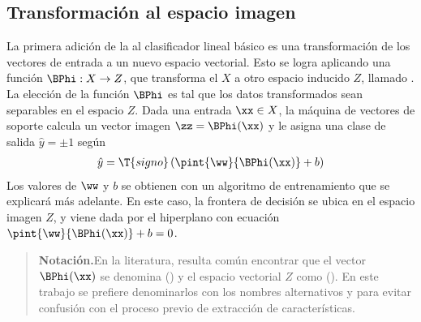 %
\subsection{Transformación al espacio imagen}
%
La primera adición de la \MVS{} al clasificador lineal básico es una
transformación de los vectores de entrada a un nuevo espacio vectorial.
Esto se logra aplicando una función $\BPhi:X\rightarrow{}Z$, que
transforma el  $X$ a otro espacio inducido $Z$,
llamado .
La elección de la función $\BPhi$ es tal que los datos transformados
sean separables en el espacio $Z$.
Dada una entrada $\xx\in{}X$, la máquina de vectores de soporte
calcula un vector imagen $\zz=\BPhi(\xx)$ y le asigna una clase de
salida $\hat{y}=\pm{}1$ según
%
\begin{align*}
  \hat{y} = \T{signo}\left(\pint{\ww}{\BPhi(\xx)}+b\right)
\end{align*}
%
Los valores de $\ww$ y $b$ se obtienen con un algoritmo de
entrenamiento que se explicará más adelante.
En este caso, la frontera de decisión se ubica en el espacio imagen
$Z$, y viene dada por el hiperplano con ecuación
$\pint{\ww}{\BPhi(\xx)}+b=0$.
%
\begin{quote}
  {\bfseries Notación.}\quad{}En la literatura, resulta común
  encontrar que el vector $\BPhi(\xx)$ se denomina  () y el espacio vectorial $Z$
  como  ().  En
  este trabajo se prefiere denominarlos con los nombres alternativos
   y  para evitar
  confusión con el proceso previo de extracción de características.
\end{quote}
%
